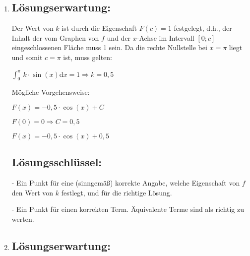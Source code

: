 \begin{langesbeispiel}
{\begin{enumerate}
	Skizze: siehe oben.
	
	Bis zum lokalen Maximum von $f$ ist die Funktion $F$ linksgekrümmt, danach ist die Funktion $F$ rechtsgekrümmt.
	
	\subsection{Lösungsschlüssel:}
	
	- Ein Punkt für die richtige Lösung und eine (sinngemäß) korrekte Begründung.
	
	- Ein Punkt für eine korrekte Skizze und eine (sinngemäß) korrekte Beschreibung des Krümmungsverhaltens der Funktion $F$. Die Skizze ist als korrekt zu betrachten, wenn das korrekte Krümmungsverhalten des Graphen von $F$ in der Skizze klar erkennbar ist und die Wendestelle von $F$ dabei bei $x=\frac{c}{2}$ liegt. Für $x>c$ muss der Graph von $F$, sofern er in diesem Bereich skizziert ist, waagrecht verlaufen.
	
	\item \subsection{Lösungserwartung:}
	
	Der Wert von $k$ ist durch die Eigenschaft $F(c)=1$ festgelegt, d.h., der Inhalt der vom Graphen von $f$ und der $x$-Achse im Intervall $[0;c]$ eingeschlossenen Fläche muss 1 sein. Da die rechte Nullstelle bei $x=\pi$ liegt und somit $c=\pi$ ist, muss gelten:
	
	$\displaystyle\int^\pi_0\,k\cdot\sin(x)$d$x=1 \Rightarrow k=0,5$
	
	Mögliche Vorgehensweise:
	
	$F(x)=-0,5\cdot\cos(x)+C$
	
	$F(0)=0 \Rightarrow C=0,5$
	
	$F(x)=-0,5\cdot\cos(x)+0,5$
	
	\subsection{Lösungsschlüssel:}
	
	- Ein Punkt für eine (sinngemäß) korrekte Angabe, welche Eigenschaft von $f$ den Wert von $k$ festlegt, und für die richtige Lösung.
	
	- Ein Punkt für einen korrekten Term. Äquivalente Terme sind als richtig zu werten.
	
	\item \subsection{Lösungserwartung:}
	

\end{enumerate}}
\end{langesbeispiel}
